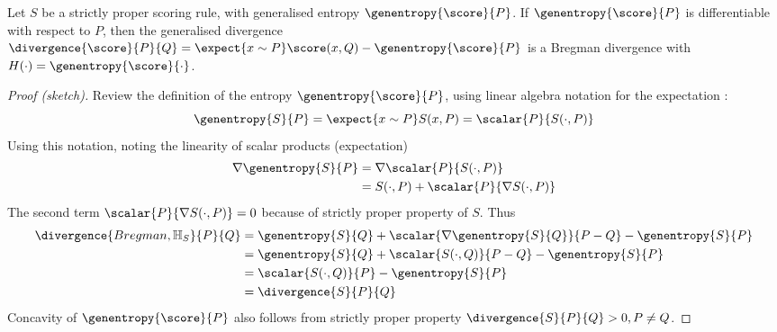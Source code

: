 \begin{statement}
	Let $S$ be a strictly proper scoring rule, with generalised entropy $\genentropy{\score}{P}$. If $\genentropy{\score}{P}$ is differentiable with respect to $P$, then the generalised divergence $\divergence{\score}{P}{Q} = \expect{x\sim P}\score(x,Q) - \genentropy{\score}{P}$ is a Bregman divergence with $H(\cdot) = \genentropy{\score}{\cdot}$.
\begin{proof}[Proof (sketch)]
	Review the definition of the entropy $\genentropy{\score}{P}$, using linear algebra notation for the expectation \citep{Amari2010}:
		\begin{equation}
			\genentropy{S}{P} = \expect{x \sim P}S(x,P) = \scalar{P}{S(\cdot,P)}
		\end{equation}
		Using this notation, noting the linearity of scalar products (expectation)
		\begin{align}
			\nabla\genentropy{S}{P} &=  \nabla\scalar{P}{S(\cdot,P)}\\
				&= S(\cdot,P) + \scalar{P}{\nabla S(\cdot,P)}
		\end{align}
	The second term $\scalar{P}{\nabla S(\cdot,P)}=0$ because of strictly proper property of $S$. Thus
 		\begin{align}
 		 	\divergence{Bregman,\mathbb{H}_{S}}{P}{Q}&= \genentropy{S}{Q}  + \scalar{\nabla \genentropy{S}{Q}}{P-Q} -  \genentropy{S}{P} \\
 		 		&= \genentropy{S}{Q} + \scalar{S(\cdot,Q)}{P - Q} -  \genentropy{S}{P}\\
 		 		&= \scalar{S(\cdot,Q)}{P} - \genentropy{S}{P}\\
 		 		&= \divergence{S}{P}{Q}
 		\end{align}
 		Concavity of $\genentropy{\score}{P}$ also follows from strictly proper property $\divergence{S}{P}{Q}>0,P\neq Q$.
\end{proof}
\end{statement}

